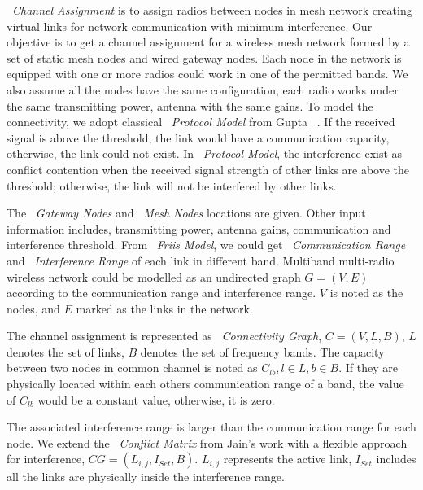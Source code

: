 ~\emph{Channel Assignment} is to assign radios between nodes in mesh network creating virtual links for network communication with minimum interference.
Our objective is to get a channel assignment for a wireless mesh network formed by a set of static mesh nodes and wired gateway nodes. 
Each node in the network is equipped with one or more radios could work in one of the permitted bands. 
We also assume all the nodes have the same configuration, each radio works under the same transmitting power, antenna with the same gains.
To model the connectivity, we adopt classical ~\emph{Protocol Model} from Gupta ~\cite{gupta2000capacity}. If the received signal is above the threshold, the link would have a communication capacity, otherwise, the link could not exist.
In ~\emph{Protocol Model}, the interference exist as conflict contention when the received signal strength of other links are above the threshold; otherwise, the link will not be interfered by other links.

The ~\emph{Gateway Nodes} and ~\emph{Mesh Nodes} locations are given. 
Other input information includes, transmitting power, antenna gains, communication and interference threshold. From ~\emph{Friis Model}, we could get ~\emph{Communication Range} and ~\emph{Interference Range} of each link in different band. 
Multiband multi-radio wireless network could be modelled as an undirected graph $G=(V,E)$ according to the communication range and interference range. $V$ is noted as the nodes, and $E$ marked as the links in the network.

The channel assignment is represented as ~\emph{Connectivity Graph}, $C=(V,L,B)$, $L$ denotes the set of links, $B$ denotes the set of frequency bands. 
The capacity between two nodes in common channel is noted as $C_{lb}, l \in L,b \in B$. If they are physically located within each others communication range of a band, the value of $C_{lb}$ would be a constant value, otherwise, it is zero. 

The associated interference range is larger than the communication range for each node. We extend the ~\emph{Conflict Matrix} from Jain's work with a flexible approach for interference, $CG=(L_{i,j},I_{Set},B)$. $L_{i,j}$ represents the active link, $I_{Set}$ includes all the links are physically inside the interference range. 

